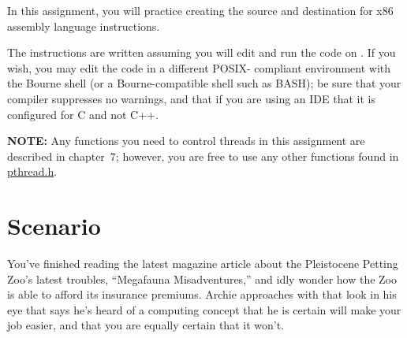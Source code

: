 


\usepackage{graphicx}

\renewcommand{\labnumber}{\concurrencylabnumber}
\renewcommand{\labname}{Concurrency Lab}
\renewcommand{\shortlabname}{concurrencylab}
\renewcommand{\collaborationrules}{\concurrencylabcollaboration}
\renewcommand{\duedate}{\concurrencylabdue}
\pagelayout

\labidentifier




In this assignment, you will practice creating the source and destination for
x86 assembly language instructions.

The instructions are written assuming you will edit and run the code on
\runtimeenvironment. If you wish, you may edit the code in a different POSIX-
compliant environment with the Bourne shell (or a Bourne-compatible shell such
as BASH); be sure that your compiler suppresses no warnings, and that if you
are using an IDE that it is configured for C and not C++.

\textbf{NOTE:} Any functions you need to control threads in this assignment are
described in chapter~7; however, you are free to use any other functions found
in \href{https://pubs.opengroup.org/onlinepubs/7908799/xsh/pthread.h.html}{pthread.h}.

\section*{Scenario}

You've finished reading the latest magazine article about the Pleistocene
Petting Zoo's latest troubles, ``Megafauna Misadventures,'' and idly wonder how
the Zoo is able to afford its insurance premiums. Archie approaches with that
look in his eye that says he's heard of a computing concept that he is certain
will make your job easier, and that you are equally certain that it won't.

